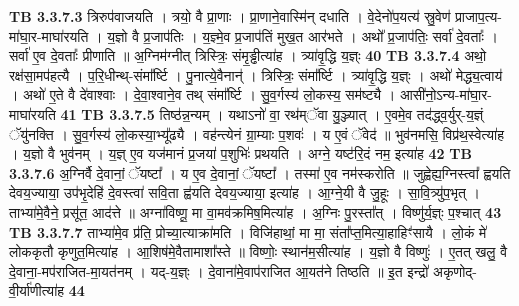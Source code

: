 \documentclass[17pt]{extarticle}
\begin{document}
{{{{{{{{{{{{{{{{{{{                  \newline
                                \textbf{ TB 3.3.7.3} \newline
                  त्रिरुप॑वाजयति । त्रयो॒ वै प्रा॒णाः । प्रा॒णाने॒वास्मि॑न् दधाति । वे॒देनो॑प॒यत्य॑ स्रु॒वेण॑ प्राजाप॒त्य-मा॑घा॒र-माघा॑रयति । य॒ज्ञो वै प्र॒जाप॑तिः । य॒ज्ञ्मे॒व प्र॒जाप॑तिं मुख॒त आर॑भते । अथो᳚ प्र॒जाप॑तिः॒ सर्वा॑ दे॒वताः᳚ । सर्वा॑ ए॒व दे॒वताः᳚ प्रीणाति ॥ अ॒ग्निम॑ग्नीत् त्रिस्त्रिः॒ संमृ॒ड्ढीत्या॑ह । त्र्या॑वृ॒द्धि य॒ज्ञ्ः \textbf{ 40} \newline
                  \newline
                                \textbf{ TB 3.3.7.4} \newline
                  अथो॒ रक्ष॑सा॒मप॑हत्यै । प॒रि॒धीन्थ्-संमा᳚र्ष्टि । पु॒नात्ये॒वैनान्॑ । त्रिस्त्रिः॒ संमा᳚र्ष्टि । त्र्या॑वृ॒द्धि य॒ज्ञ्ः । अथो॑ मेद्ध्य॒त्वाय॑ । अथो॑ ए॒ते वै दे॑वाश्वाः । दे॒वा॒श्वाने॒व तथ् संमा᳚र्ष्टि । सु॒व॒र्गस्य॑ लो॒कस्य॒ सम॑ष्ट्यै । आसी॑नो॒ऽन्य-मा॑घा॒र-माघा॑रयति \textbf{ 41} \newline
                  \newline
                                \textbf{ TB 3.3.7.5} \newline
                  तिष्ठ॑न्न॒न्यम् । यथाऽनो॑ वा॒ रथ॑म्ॅवा यु॒ञ्ज्यात् । ए॒वमे॒व तद॑द्ध्व॒र्युर्-य॒ज्ञ्ं ॅयु॑नक्ति । सु॒व॒र्गस्य॑ लो॒कस्या॒भ्यू᳚ढ्यै । वह॑न्त्येनं ग्रा॒म्याः प॒शवः॑ । य ए॒वं ॅवेद॑ ॥ भुव॑नमसि॒ विप्र॑थ॒स्वेत्या॑ह । य॒ज्ञो वै भुव॑नम् । य॒ज्ञ् ए॒व यज॑मानं प्र॒जया॑ प॒शुभिः॑ प्रथयति । अग्ने॒ यष्ट॑रि॒दं नम॒ इत्या॑ह \textbf{ 42} \newline
                  \newline
                                \textbf{ TB 3.3.7.6} \newline
                  अ॒ग्निर्वै दे॒वानां॒ ॅयष्टा᳚ । य ए॒व दे॒वानां॒ ॅयष्टा᳚ । तस्मा॑ ए॒व नम॑स्करोति ॥ जुह्वेह्य॒ग्निस्त्वा᳚ ह्वयति देवय॒ज्याया॒ उप॑भृ॒देहि॑ दे॒वस्त्वा॑ सवि॒ता ह्व॑यति देवय॒ज्याया॒ इत्या॑ह । आ॒ग्ने॒यी वै जु॒हूः । सा॒वि॒त्र्यु॑प॒भृत् । ताभ्या॑मे॒वैने॒ प्रसू॑त॒ आद॑त्ते ॥ अग्ना॑विष्णू॒ मा वा॒मव॑क्रमिष॒मित्या॑ह । अ॒ग्निः पु॒रस्ता᳚त् । विष्णु॑र्य॒ज्ञ्ः प॒श्चात् \textbf{ 43} \newline
                  \newline
                                \textbf{ TB 3.3.7.7} \newline
                  ताभ्या॑मे॒व प्र॑ति॒ प्रोच्या॒त्याक्रा॑मति । विजि॑हाथां॒ मा मा॒ संता᳚प्त॒मित्या॒हाहिꣳ॑सायै । लो॒कं मे॑ लोककृतौ कृणुत॒मित्या॑ह । आ॒शिष॑मे॒वैतामाशा᳚स्ते ॥ विष्णोः॒ स्थान॑म॒सीत्या॑ह । य॒ज्ञो वै विष्णुः॑ । ए॒तत् खलु॒ वै दे॒वाना॒-मप॑राजित-मा॒यत॑नम् । यद्-य॒ज्ञ्ः । दे॒वाना॑मे॒वाप॑राजित आ॒यत॑ने तिष्ठति ॥ इ॒त इन्द्रो॑ अकृणोद्-वी॒र्या॑णीत्या॑ह \textbf{ 44} \newline
}}}}}}}}}}}}}}}}}}}
\end{document}
